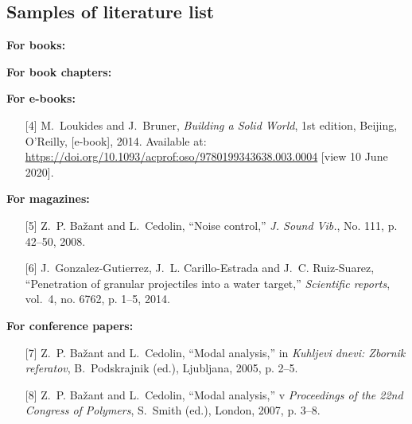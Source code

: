 \subsection{Samples of literature list}\label{sec:zzorci_lit}

\textbf{For books:}

\textbf{For book chapters:}

\textbf{For e-books:}
\begin{itemize}
\item[{[4]}] M.~Loukides and J.~Bruner, \emph{Building a Solid World},
1st edition,
Beijing, O'Reilly, [e-book], 2014. Available at:
\url{https://doi.org/10.1093/acprof:oso/9780199343638.003.0004} [view 10
June 2020].
\end{itemize}

\textbf{For magazines:}
\begin{itemize}
\item[{[5]}] Z.~P. Ba\v{z}ant and L.~Cedolin, ``Noise control,'' \emph{J.
Sound
Vib.}, No. 111, p. 42--50, 2008.\\
\item[{[6]}] J.~Gonzalez-Gutierrez, J.~L. Carillo-Estrada and J.~C.
Ruiz-Suarez,
``Penetration of granular projectiles into a water target,''
\emph{Scientific
reports}, vol.~4, no. 6762, p. 1--5, 2014.
\end{itemize}

\textbf{For conference papers:}
\begin{itemize}
\item[{[7]}] Z.~P. Ba\v{z}ant and L.~Cedolin, ``Modal analysis,'' in
\emph{Kuhljevi dnevi: Zbornik referatov}, B.~Podskrajnik (ed.), Ljubljana,
2005, p. 2--5.\\

\item[{[8]}] Z.~P. Ba\v{z}ant and L.~Cedolin, ``Modal analysis,'' v
\emph{Proceedings of the 22nd Congress of Polymers}, S.~Smith (ed.), London,
2007, p. 3--8.\\
\end{itemize}

